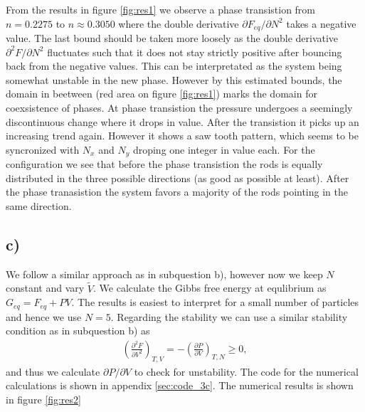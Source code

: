 \documentclass[reprint, amsmath, amssymb, aps, onecolumn]{revtex4-2}
\newcommand{\dd}[3]{\left(\frac{\partial #1}{\partial #2}\right)_{#3}}
\begin{document}
From the results in figure \ref{fig:res1} we observe a phase transistion from $n = 0.2275$ to $n \approx 0.3050$ where the double derivative $\partial F_{eq} / \partial N^2$ takes a negative value. The last bound should be taken more loosely as the double derivative $\partial^2 F/\partial N^2$ fluctuates such that it does not stay strictly positive after bouncing back from the negative values. This can be interpretated as the system being somewhat unstable in the new phase. However by this estimated bounds, the domain in beetween (red area on figure \ref{fig:res1}) marks the domain for coexsistence of phases. At phase transistion the pressure undergoes a seemingly discontinuous change where it drops in value. After the transistion it picks up an increasing trend again. However it shows a saw tooth pattern, which seems to be syncronized with $N_x$ and $N_y$ droping one integer in value each. For the configuration we see that before the phase transistion the rods is equally distributed in the three possible directions (as good as possible at least). After the phase tranasistion the system favors a majority of the rods pointing in the same direction.
%
%
\subsection*{c)}
\noindent We follow a similar approach as in subquestion b), however now we keep $N$ constant and vary $\tilde{V}$. We calculate the Gibbs free energy at equlibrium as $G_{eq} = F_{eq} + PV$. The results is easiest to interpret for a small number of particles and hence we use $N = 5$. Regarding the stability we can use a similar stability condition as in subquestion b) as
\begin{align}
    \left(\frac{\partial^2 F}{\partial V^2}\right)_{T,V} = -\dd{P}{V}{T,N} \ge 0, \label{eq:stability2}
\end{align}
and thus we calculate $\partial P / \partial V$ to check for unstability. The code for the numerical calculations is shown in appendix \ref{sec:code_3c}. The numerical results is shown in figure \ref{fig:res2}
\end{document}
